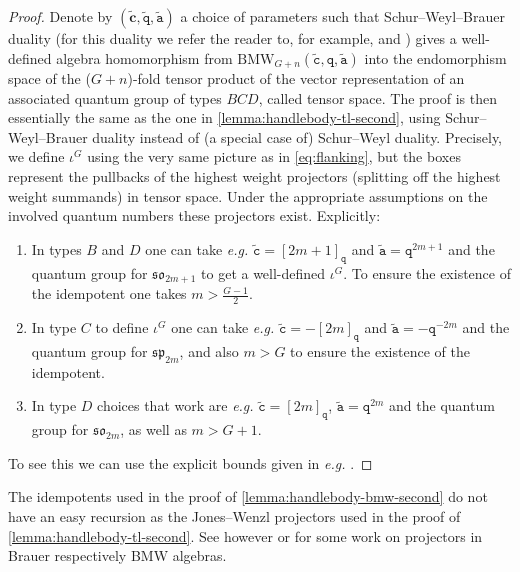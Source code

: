 \documentclass[a4paper,11pt]{amsart}
\newcommand{\eg}{\textsl{e.g.}}
\newcommand{\setstuff}[1]{\mathrm{#1}}
\newcommand{\bsym}[1]{\boldsymbol{#1}}
\newcommand{\varsym}[1]{\mathtt{#1}}
\newcommand{\qvar}{\varsym{q}}
\newcommand{\cpar}{\bsym{c}}
\newcommand{\cvar}{\varsym{c}}
\newcommand{\avar}{\varsym{a}}
\numberwithin{equation}{section}
\let\fullref\autoref
\begin{document}
\begin{proof}
Denote by $(\tilde{\cpar},\tilde{\qvar},\tilde{\avar})$ 
a choice of parameters such that Schur--Weyl--Brauer duality 
(for this duality 
we refer the reader to, for example, \cite[Theorem 3.17]{AnStTu-semisimple-tilting} 
and \cite[Theorem 1.3]{Hu-bmw-typec})
gives a well-defined algebra homomorphism from 
$\setstuff{BMW}_{G+n}(\tilde{\cvar},\qvar,\tilde{\avar})$
into the endomorphism space of the ($G+n$)-fold 
tensor product of the vector representation of an associated quantum 
group of types $BCD$, called tensor space. 
The proof is then essentially the same as the one in 
\fullref{lemma:handlebody-tl-second}, using 
Schur--Weyl--Brauer duality instead of 
(a special case of) Schur--Weyl duality. Precisely, 
we define $\iota^{G}$ using the very same picture as in \eqref{eq:flanking}, 
but the boxes represent 
the pullbacks of the highest weight projectors 
(splitting off the highest weight summands) in tensor space. 
Under the appropriate 
assumptions on the involved quantum numbers these 
projectors exist. Explicitly:
\begin{enumerate}[label=$\bullet$]

\item In types $B$ and $D$ one can take {\eg} $\tilde{\cvar}=[2m+1]_{\qvar}$
and $\tilde{\avar}=\qvar^{2m+1}$ and the quantum group 
for $\mathfrak{so}_{2m+1}$ to get a well-defined 
$\iota^{G}$. To ensure the existence of the idempotent 
one takes $m>\tfrac{G-1}{2}$.

\item In type $C$ to define $\iota^{G}$ one 
can take {\eg} $\tilde{\cvar}=-[2m]_{\qvar}$
and $\tilde{\avar}=-\qvar^{-2m}$ and the quantum group 
for $\mathfrak{sp}_{2m}$, and also $m>G$ to ensure the existence of the idempotent.

\item In type $D$ choices that work are {\eg} $\tilde{\cvar}=[2m]_{\qvar}$,
$\tilde{\avar}=\qvar^{2m}$ and the quantum group 
for $\mathfrak{so}_{2m}$, as well as $m>G+1$.

\end{enumerate}
To see this we can use the explicit bounds given in 
{\eg} \cite[Theorem 3.17]{AnStTu-semisimple-tilting}.
\end{proof}

\begin{remark}
The idempotents used in the proof of 
\fullref{lemma:handlebody-bmw-second} do not have 
an easy recursion as the Jones--Wenzl projectors used in 
the proof of \fullref{lemma:handlebody-tl-second}.
See however \cite{IsMoOg-bmw-idempotents} or \cite{LeZh-brauer-invariant-theory} 
for some work on projectors in Brauer respectively BMW algebras.
\end{remark}
\end{document}
